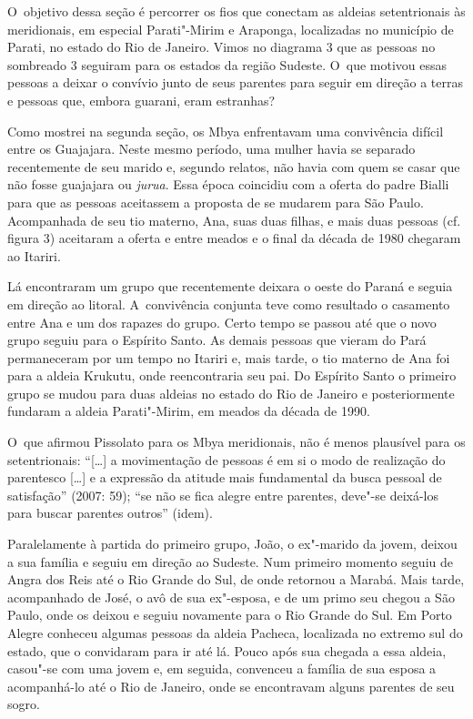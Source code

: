 O~objetivo dessa seção é percorrer os fios que conectam as aldeias
setentrionais às meridionais, em especial Parati"-Mirim e Araponga,
localizadas no município de Parati, no estado do Rio de Janeiro. Vimos
no diagrama 3 que as pessoas no sombreado 3 seguiram para os estados da
região Sudeste. O~que motivou essas pessoas a deixar o convívio junto
de seus parentes para seguir em direção a terras e pessoas que, embora
guarani, eram estranhas?

Como mostrei na segunda seção, os Mbya enfrentavam uma convivência
difícil entre os Guajajara. Neste mesmo período, uma mulher havia se
separado recentemente de seu marido e, segundo relatos, não havia com
quem se casar que não fosse guajajara ou \emph{jurua}. Essa época coincidiu
com a oferta do padre Bialli para que as pessoas aceitassem a proposta
de se mudarem para São Paulo. Acompanhada de seu tio materno, Ana, suas
duas filhas, e mais duas pessoas (cf. figura 3) aceitaram a oferta e
entre meados e o final da década de 1980 chegaram ao Itariri.

Lá encontraram um grupo que recentemente deixara o oeste do Paraná e
seguia em direção ao litoral. A~convivência conjunta teve como
resultado o casamento entre Ana e um dos rapazes do grupo. Certo tempo
se passou até que o novo grupo seguiu para o Espírito Santo. As demais
pessoas que vieram do Pará permaneceram por um tempo no Itariri e, mais
tarde, o tio materno de Ana foi para a aldeia Krukutu, onde
reencontraria seu pai. Do Espírito Santo o primeiro grupo se mudou para
duas aldeias no estado do Rio de Janeiro e posteriormente fundaram a
aldeia Parati"-Mirim, em meados da década de 1990.

O~que afirmou Pissolato para os Mbya meridionais, não é menos plausível
para os setentrionais: ``[\ldots{}] a movimentação de pessoas é em si o modo
de realização do parentesco [\ldots{}] e a expressão da atitude mais
fundamental da busca pessoal de satisfação'' (2007: 59); ``se não se fica
alegre entre parentes, deve"-se deixá-los para buscar parentes outros''
(idem).

Paralelamente à partida do primeiro grupo, João, o ex"-marido da jovem,
deixou a sua família e seguiu em direção ao Sudeste. Num primeiro
momento seguiu de Angra dos Reis até o Rio Grande do Sul, de onde
retornou a Marabá. Mais tarde, acompanhado de José, o avô de sua
ex"-esposa, e de um primo seu chegou a São Paulo, onde os deixou e
seguiu novamente para o Rio Grande do Sul. Em Porto Alegre conheceu
algumas pessoas da aldeia Pacheca, localizada no extremo sul do estado,
que o convidaram para ir até lá. Pouco após sua chegada a essa aldeia,
casou"-se com uma jovem e, em seguida, convenceu a família de sua esposa
a acompanhá-lo até o Rio de Janeiro, onde se encontravam alguns
parentes de seu sogro.

